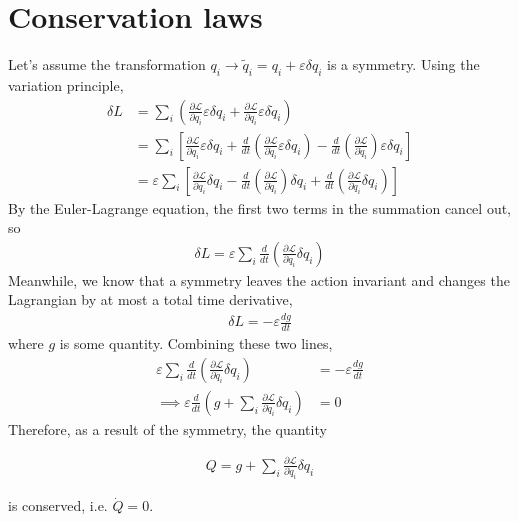 \documentclass[12pt]{book} %
\numberwithin{equation}{chapter}
\def\d{\delta}
\def\e{\varepsilon}
\def\La{\mathcal{L}}
\def\p{\partial}
\begin{document}
\section{Conservation laws}
Let's assume the transformation $q_{i}\to\tilde{q}_{i}=q_{i}+\e\d q_{i}$ is a symmetry. Using the variation principle,
\begin{align*}
\d L&=\sum_{i}\left(\frac{\p \La}{\p q_{i}}\e\d q_{i}+\frac{\p \La}{\p q_{i}}\e\d \dot{q}_{i}\right)\\
&=\sum_{i}\left[\frac{\p \La}{\p q_{i}}\e\d q_{i}+\frac{d}{dt}\left(\frac{\p \La}{\p \dot{q}_{i}}\e\d q_{i}\right)-\frac{d}{dt}\left(\frac{\p \La}{\p \dot{q}_{i}}\right)\e\d q_{i}\right]\\
&=\e\sum_{i}\left[\frac{\p \La}{\p q_{i}}\d q_{i}-\frac{d}{dt}\left(\frac{\p \La}{\p \dot{q}_{i}}\right)\d q_{i}+\frac{d}{dt}\left(\frac{\p \La}{\p \dot{q}_{i}}\d q_{i}\right)\right]
\end{align*}
By the Euler-Lagrange equation, the first two terms in the summation cancel out, so
\begin{align*}
\d L=\e\sum_{i}\frac{d}{dt}\left(\frac{\p \La}{\p \dot{q}_{i}}\d q_{i}\right)
\end{align*}
Meanwhile, we know that a symmetry leaves the action invariant and changes the Lagrangian by at most a total time derivative,
\begin{align*}
\d L=-\e\frac{dg}{dt}
\end{align*}
where $g$ is some quantity. Combining these two lines,
\begin{align*}
\e\sum_{i}\frac{d}{dt}\left(\frac{\p \La}{\p \dot{q}_{i}}\d q_{i}\right)&=-\e\frac{dg}{dt}\\
\implies \e\frac{d}{dt}\left(g+\sum_{i}\frac{\p \La}{\p \dot{q}_{i}}\d q_{i}\right)&=0
\end{align*}
Therefore, as a result of the symmetry, the quantity
\begin{eqnbox}
\begin{align}
Q=g+\sum_{i}\frac{\p \La}{\p \dot{q}_{i}}\d q_{i}
\end{align}
\end{eqnbox}
is conserved, i.e. $\dot{Q}=0$.
\end{document}
